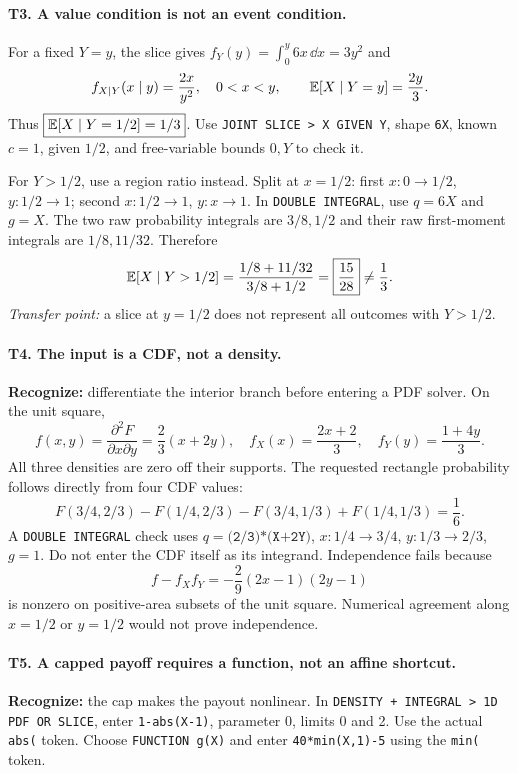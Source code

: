 \paragraph{T3. A value condition is not an event condition.}
For a fixed $Y=y$, the slice gives $f_Y(y)=\int_0^y6x\,\dd x=3y^2$ and
\[
f_{X\mid Y}(x\mid y)=\frac{2x}{y^2},\quad0<x<y,
\qquad \mathbb E[X\mid Y=y]=\frac{2y}{3}.
\]
Thus $\boxed{\mathbb E[X\mid Y=1/2]=1/3}$. Use \texttt{JOINT SLICE > X GIVEN Y}, shape \texttt{6X}, known $c=1$, given $1/2$, and free-variable bounds $0,Y$ to check it.

For $Y>1/2$, use a region ratio instead. Split at $x=1/2$: first $x:0\to1/2$, $y:1/2\to1$; second $x:1/2\to1$, $y:x\to1$. In \texttt{DOUBLE INTEGRAL}, use $q=6X$ and $g=X$. The two raw probability integrals are $3/8,1/2$ and their raw first-moment integrals are $1/8,11/32$. Therefore
\[
\mathbb E[X\mid Y>1/2]
=\frac{1/8+11/32}{3/8+1/2}=\boxed{\frac{15}{28}}\ne\frac13.
\]
\emph{Transfer point:} a slice at $y=1/2$ does not represent all outcomes with $Y>1/2$.

\paragraph{T4. The input is a CDF, not a density.}
\textbf{Recognize:} differentiate the interior branch before entering a PDF solver. On the unit square,
\[
f(x,y)=\frac{\partial^2F}{\partial x\partial y}
=\frac23(x+2y),\quad
f_X(x)=\frac{2x+2}{3},\quad f_Y(y)=\frac{1+4y}{3}.
\]
All three densities are zero off their supports. The requested rectangle probability follows directly from four CDF values:
\[
F(3/4,2/3)-F(1/4,2/3)-F(3/4,1/3)+F(1/4,1/3)
=\boxed{\frac16}.
\]
A \texttt{DOUBLE INTEGRAL} check uses $q=\texttt{(2/3)*(X+2Y)}$, $x:1/4\to3/4$, $y:1/3\to2/3$, $g=1$. Do not enter the CDF itself as its integrand. Independence fails because
\[
f-f_Xf_Y=-\frac29(2x-1)(2y-1)
\]
is nonzero on positive-area subsets of the unit square. Numerical agreement along $x=1/2$ or $y=1/2$ would not prove independence.

\paragraph{T5. A capped payoff requires a function, not an affine shortcut.}
\textbf{Recognize:} the cap makes the payout nonlinear. In \texttt{DENSITY + INTEGRAL > 1D PDF OR SLICE}, enter \texttt{1-abs(X-1)}, parameter 0, limits 0 and 2. Use the actual \texttt{abs(} token. Choose \texttt{FUNCTION g(X)} and enter \texttt{40*min(X,1)-5} using the \texttt{min(} token.

